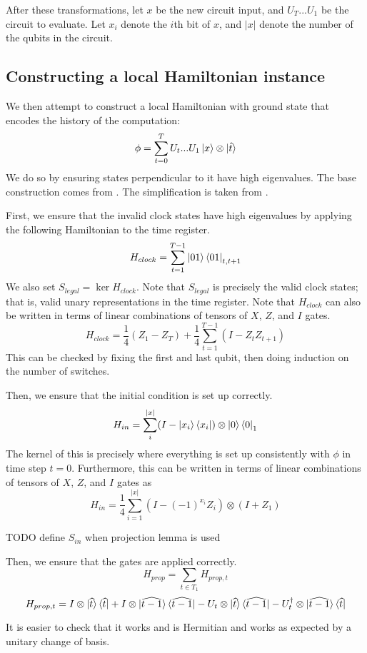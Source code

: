 After these transformations, let $x$ be the new circuit input, and $U_T...U_1$ be the circuit to evaluate. Let $x_i$ denote the $i$th bit of $x$, and $|x|$ denote the number of the qubits in the circuit.

\subsection{Constructing a local Hamiltonian instance}

We then attempt to construct a local Hamiltonian with ground state that encodes the history of the computation: $$\phi=\sum_{t=0}^TU_t...U_1\ket{x}\otimes\ket{\hat{t}}$$
We do so by ensuring states perpendicular to it have high eigenvalues. The base construction comes from \cite{kitaev2002classical}. The simplification is taken from \cite{PhysRevA.78.012352}.

First, we ensure that the invalid clock states have high eigenvalues by applying the following Hamiltonian to the time register.
$$H_{clock}=\sum_{t=1}^{T-1}\ket{01}\bra{01}_{t,t+1}$$
We also set $S_{legal}=\ker H_{clock}$. Note that $S_{legal}$ is precisely the valid clock states; that is, valid unary representations in the time register. Note that $H_{clock}$ can also be written in terms of linear combinations of tensors of $X$, $Z$, and $I$ gates.
$$H_{clock}=\frac{1}{4}(Z_1 - Z_T) + \frac{1}{4}\sum_{t=1}^{T-1}(I-Z_tZ_{t+1}) $$
This can be checked by fixing the first and last qubit, then doing induction on the number of switches.

Then, we ensure that the initial condition is set up correctly.
$$H_{in}=\sum_i^{|x|}(I-\ket{x_i}\bra{x_i})\otimes\ket{0}\bra{0}_1$$
The kernel of this is precisely where everything is set up consistently with $\phi$ in time step $t=0$. Furthermore, this can be written in terms of linear combinations of tensors of $X$, $Z$, and $I$ gates as
$$H_{in}=\frac{1}{4}\sum_{i=1}^{|x|}(I-(-1)^{x_i}Z_i)\otimes(I+Z_1)$$

TODO define $S_{in}$ when projection lemma is used

Then, we ensure that the gates are applied correctly.
$$H_{prop}=\sum_{t\in T_1}H_{prop,t}$$
$$H_{prop,t}=I\otimes\ket{\widehat{t}}\bra{\widehat{t}}
	+I\otimes\ket{\widehat{t-1}}\bra{\widehat{t-1}}
	-U_t\otimes\ket{\widehat{t}}\bra{\widehat{t-1}}
	-U_t^\dagger\otimes\ket{\widehat{t-1}}\bra{\widehat{t}}$$

It is easier to check that it works and is Hermitian and works as expected by a unitary change of basis.

